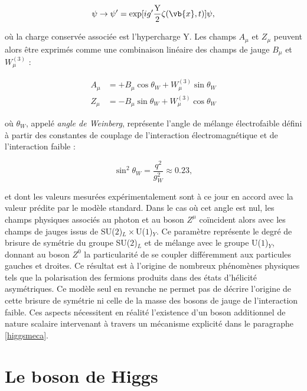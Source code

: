     \begin{equation}
        \psi\rightarrow\psi'=\exp[ig'\frac{\mbox{Y}}{2}\zeta(\vb{x},t)]\psi,
    \label{localU1Y}
    \end{equation}

    où la charge conservée associée est l'hypercharge Y. Les champs $A_\mu$ et $Z_\mu$ peuvent alors être exprimés comme une combinaison linéaire des champs de jauge $B_\mu$ et $W^{(3)}_\mu$ :

    \begin{equation}
    \begin{array}{ll}
         A_\mu & = +B_\mu\cos\theta_W+W^{(3)}_\mu\sin\theta_W \\
         Z_\mu & = -B_\mu\sin\theta_W+W^{(3)}_\mu\cos\theta_W
    \end{array}
    \end{equation}

    où $\theta_W$, appelé \textit{angle de Weinberg}, représente l'angle de mélange électrofaible défini à partir des constantes de couplage de l'interaction électromagnétique et de l'interaction faible :

    $$\sin^2\theta_W=\frac{q^2}{g^2_W}\approx 0.23,$$

    et dont les valeurs mesurées expérimentalement sont à ce jour en accord avec la valeur prédite par le modèle standard. Dans le cas où cet angle est nul, les champs physiques associés au photon et au boson $Z^\mu$ coïncident alors avec les champs de jauges issus de SU($2$)$_L\times$U($1$)$_Y$. Ce paramètre représente le degré de brisure de symétrie du groupe SU($2$)$_L$ et de mélange avec le groupe U($1$)$_Y$, donnant au boson $Z^0$ la particularité de se coupler différemment aux particules gauches et droites. Ce résultat est à l'origine de nombreux phénomènes physiques tels que la polarisation des fermions produits dans des états d'hélicité asymétriques. Ce modèle seul en revanche ne permet pas de décrire l'origine de cette brisure de symétrie ni celle de la masse des bosons de jauge de l'interaction faible. Ces aspects nécessitent en réalité l'existence d'un boson additionnel de nature scalaire intervenant à travers un mécanisme explicité dans le paragraphe \ref{higgsmeca}.

    \section{Le boson de Higgs}

